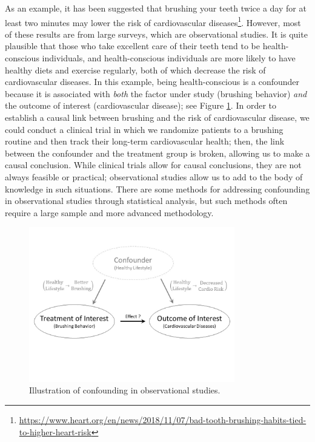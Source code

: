 \documentclass[
]{book}
\theoremstyle{plain}
\theoremstyle{mydefn}
\theoremstyle{myexmpl}
\theoremstyle{remark}
\begin{document}
As an example, it has been suggested that brushing your teeth twice a day for at least two minutes may lower the risk of cardiovascular diseases\footnote{\url{https://www.heart.org/en/news/2018/11/07/bad-tooth-brushing-habits-tied-to-higher-heart-risk}}. However, most of these results are from large surveys, which are observational studies. It is quite plausible that those who take excellent care of their teeth tend to be health-conscious individuals, and health-conscious individuals are more likely to have healthy diets and exercise regularly, both of which decrease the risk of cardiovascular diseases. In this example, being health-conscious is a confounder because it is associated with \emph{both} the factor under study (brushing behavior) \emph{and} the outcome of interest (cardiovascular disease); see Figure \ref{fig:statistical-process-confounding}. In order to establish a causal link between brushing and the risk of cardiovascular disease, we could conduct a clinical trial in which we randomize patients to a brushing routine and then track their long-term cardiovascular health; then, the link between the confounder and the treatment group is broken, allowing us to make a causal conclusion. While clinical trials allow for causal conclusions, they are not always feasible or practical; observational studies allow us to add to the body of knowledge in such situations. There are some methods for addressing confounding in observational studies through statistical analysis, but such methods often require a large sample and more advanced methodology.

\begin{figure}

{\centering \includegraphics[width=0.8\textwidth]{images/Statistical-Process-Confounding} 

}

\caption{Illustration of confounding in observational studies.}\label{fig:statistical-process-confounding}
\end{figure}
\end{document}
